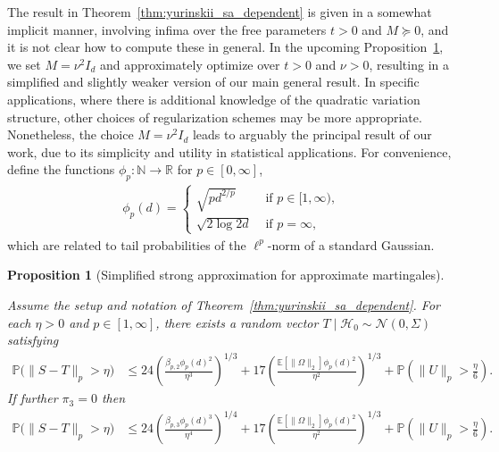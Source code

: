 \documentclass[11pt,lof]{puthesis}
\renewcommand{\P}{\ensuremath{\mathbb{P}}}
\newcommand{\N}{\ensuremath{\mathbb{N}}}
\newcommand{\R}{\ensuremath{\mathbb{R}}}
\newcommand{\E}{\ensuremath{\mathbb{E}}}
\newcommand{\cH}{\ensuremath{\mathcal{H}}}
\newcommand{\cN}{\ensuremath{\mathcal{N}}}
\theoremstyle{break}
\newtheorem{proposition}{Proposition}[section]
\theoremstyle{proof}
\begin{document}
The result in Theorem~\ref{thm:yurinskii_sa_dependent} is given in a somewhat
implicit
manner, involving infima over the free parameters $t > 0$ and $M \succeq 0$,
and it is not clear how to compute these in general. In the upcoming
Proposition~\ref{pro:yurinskii_sa_simplified}, we set $M = \nu^2 I_d$ and
approximately
optimize over $t > 0$ and $\nu > 0$, resulting in a simplified and slightly
weaker version of our main general result. In specific applications, where
there is additional knowledge of the quadratic variation structure, other
choices of regularization schemes may be more appropriate. Nonetheless, the
choice $M = \nu^2 I_d$ leads to arguably the principal result of our work,
due to its simplicity and utility in statistical applications. For convenience,
define the functions $\phi_p : \N \to \R$ for $p \in [0, \infty]$,
%
\begin{align*}
\phi_p(d) =
\begin{cases}
\sqrt{pd^{2/p} } & \text{ if } p \in [1,\infty), \\
\sqrt{2\log 2d} & \text{ if } p =\infty,
\end{cases}
\end{align*}
%
which are related to tail probabilities
of the $\ell^p$-norm of a standard Gaussian.

\begin{proposition}[Simplified strong approximation
for approximate martingales]%
\label{pro:yurinskii_sa_simplified}

Assume the setup and notation of Theorem~\ref{thm:yurinskii_sa_dependent}.
For each $\eta > 0$ and $p \in [1,\infty]$,
there exists a random vector $T \mid \cH_0 \sim \cN(0, \Sigma)$ satisfying
%
\begin{align*}
\P\big(\|S-T\|_p > \eta\big)
&\leq
24 \left(
\frac{\beta_{p,2} \phi_p(d)^2}{\eta^3}
\right)^{1/3}
+ 17 \left(
\frac{\E \left[ \|\Omega\|_2 \right] \phi_p(d)^2}{\eta^2}
\right)^{1/3}
+\P\left(\|U\|_p>\frac{\eta}{6}\right).
\end{align*}
%
If further $\pi_3 = 0$ then
%
\begin{align*}
\P\big(\|S-T\|_p > \eta\big)
&\leq
24 \left(
\frac{\beta_{p,3} \phi_p(d)^3}{\eta^4}
\right)^{1/4}
+ 17 \left(
\frac{\E \left[ \|\Omega\|_2 \right] \phi_p(d)^2}{\eta^2}
\right)^{1/3}
+\P\left(\|U\|_p>\frac{\eta}{6}\right).
\end{align*}
%
\end{proposition}
\end{document}

